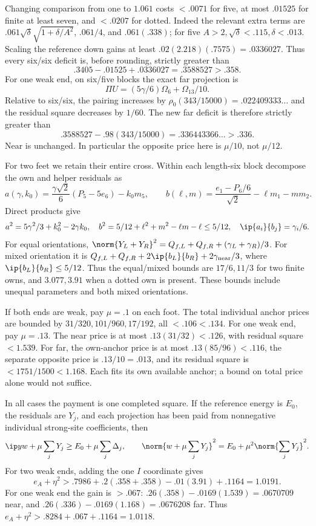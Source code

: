 Changing comparison from one to \(1.061\) costs \(<.0071\)
for five, at most \(.01525\) for finite at least seven, and
\(<.0207\) for dotted. Indeed the relevant extra terms are
\(.061\sqrt\delta\sqrt{1+\delta/A^2}\),
\(.061/4\), and \(.061(.338)\); for five
\(A>2,\sqrt\delta<.115,\delta<.013\).
Scaling the reference down gains at least
\(.02(2.218)(.7575)=.0336027\).
Thus every six/six deficit is, before rounding, strictly greater than
\[
 .3405-.01525+.0336027=.3588527>.358 .
\]
For one weak end, on six/five blocks the exact far projection is
\[
 \Pi U=(5\gamma/6)\Omega_6+\Omega_{13}/10 .
\]
Relative to six/six, the pairing increases by
\(\rho_0(343/15000)=.022409333\ldots\)
and the residual square decreases by \(1/60\).
The new far deficit is therefore strictly greater than
\[
 .3588527-.98(343/15000)=.336443366\ldots>.336 .
\]
Near is unchanged. In particular the opposite price here is
\(\mu/10\), not \(\mu/12\).

For two feet we retain their entire cross.
Within each length-six block decompose the own and helper residuals as
\[
 a(\gamma,k_0)=\frac{\gamma\sqrt2}{6}(P_5-5e_6)-k_0m_5,\qquad
 b(\ell,m)=\frac{e_1-P_6/6}{\sqrt2}-\ell m_1-mm_2 .
\]
Direct products give
\[
 a^2=5\gamma^2/3+k_0^2-2\gamma k_0,\quad
 b^2=5/12+\ell^2+m^2-\ell m-\ell\leq5/12,\quad
 \ip{a_i}{b_j}=\gamma_i/6 .
\]
For equal orientations,
\(\norm{Y_L+Y_R}^2=Q_{f,L}+Q_{f,R}+(\gamma_L+\gamma_R)/3\).
For mixed orientation it is
\(Q_{f,L}+Q_{f,R}+2\ip{b_L}{b_R}+2\gamma_{\rm near}/3\),
where \(\ip{b_L}{b_R}\leq5/12\).
Thus the equal/mixed bounds are \(17/6,11/3\) for two finite
owns, and \(3.077,3.91\) when a dotted own is present.
These bounds include unequal parameters and both mixed orientations.

If both ends are weak, pay \(\mu=.1\) on each foot.
The total individual anchor prices are bounded by
\(31/320,101/960,17/192\), all \(<.106<.134\).
For one weak end, pay \(\mu=.13\).
The near price is at most \(.13(31/32)<.126\), with
residual square \(<1.539\).
For far, the own-anchor price is at most \(.13(85/96)<.116\),
the separate opposite price is \(.13/10=.013\),
and its residual square is \(<1751/1500<1.168\).
Each fits its own available anchor; a bound on total price alone
would not suffice.

In all cases the payment is one completed square.
If the reference energy is \(E_0\), the residuals are \(Y_j\),
and each projection has been paid from nonnegative individual
strong-site coefficients, then
\[
 \ip y{w+\mu\sum_jY_j}\geq E_0+\mu\sum_j\Delta_j,\qquad
 \norm{w+\mu\sum_jY_j}^2=E_0+\mu^2\norm{\sum_jY_j}^2 .
\]
For two weak ends, adding the one \(I\) coordinate gives
\[
 e_A+\eta^2>
 .7986+.2(.358+.358)-.01(3.91)+.1164=1.0191.
\]
For one weak end the gain is \(>.067\):
\(.26(.358)-.0169(1.539)=.0670709\) near, and
\(.26(.336)-.0169(1.168)=.0676208\) far.
Thus \(e_A+\eta^2>.8284+.067+.1164=1.0118\).

